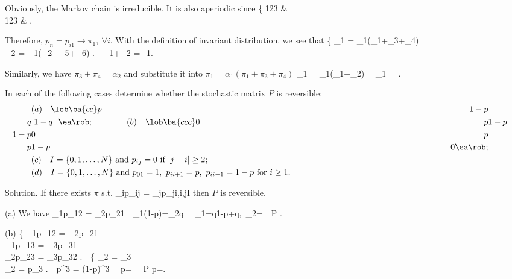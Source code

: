 Obviously, the Markov chain is irreducible. It is also aperiodic since
\be
\left\{
123 & \\
123   \quad\quad &
\ea\right.\
\ee

Therefore, $p_n=p_{i1}\to \pi_1,\ \forall i$. With the definition of invariant distribution. we see that
\be
\left\{
\pi_1 = \alpha_1(\pi_1+\pi_3+\pi_4) \\
\pi_2 = \alpha_1(\pi_2+\pi_5+\pi_6)
\ea\right.\ \ra \
\pi_1+\pi_2 =\alpha_1.
\ee

Similarly, we have $\pi_3+\pi_4 = \alpha_2$ and substitute it into $\pi_1 = \alpha_1(\pi_1+\pi_3+\pi_4)$
\be
\pi_1 = \alpha_1(\pi_1+\alpha_2) \ \ra \ \pi_1 = \frac {\alpha_1\alpha_2}{1-\alpha_1}.
\ee

\begin{exercise}
In each of the following cases determine whether the stochastic matrix $P$ is reversible:
\begin{align*}
& (a)\quad \lob
\ba{cc}
p & 1-p\\
q & \ 1-q \ \
\ea\rob
;\quad\quad\quad\quad
(b)\quad \lob
\ba{ccc}
0 & p & 1-p\\
1-p & 0 & p \\
p& 1-p & 0
\ea\rob;\\
& (c)\quad I=\{0,1,\dots, N\} \text{ and } p_{ij}=0\text{ if }|j-i|\geq 2; \\
& (d)\quad I=\{0,1,\dots, N\} \text{ and } p_{01} = 1,\ p_{ii+1}=p,\ p_{ii-1}=1-p \text{ for }i\geq 1. \quad\quad\quad\quad\quad\quad\quad\quad\quad\quad\quad\quad\quad\quad\quad\quad\quad\quad
\end{align*}
\end{exercise}

Solution. If there exists $\pi$ s.t.
\be
\pi_ip_{ij} = \pi_jp_{ji},\quad \forall i,j\in I
\ee
then $P$ is reversible.

(a) We have
\be
\pi_1p_{12} = \pi_2p_{21}\ \ra\ \pi_1(1-p)=\pi_2q \ \ra \ \pi_1=\frac q{1-p+q},\ \pi_2=\ \ra \ P .
\ee

(b)
\be
\left\{
\pi_1p_{12} = \pi_2p_{21}\\
\pi_1p_{13} = \pi_3p_{31}\\
\pi_2p_{23} = \pi_3p_{32}
\ea\right.\ \ra \
\left\{
\ba{l}
\pi_2 = \pi_3\\
\pi_2 = \frac{1-p}p\pi_3
\ea\right.\ \ra \ p^3 = (1-p)^3 \ \ra \ p= \ \ra \ P p=.
\ee

